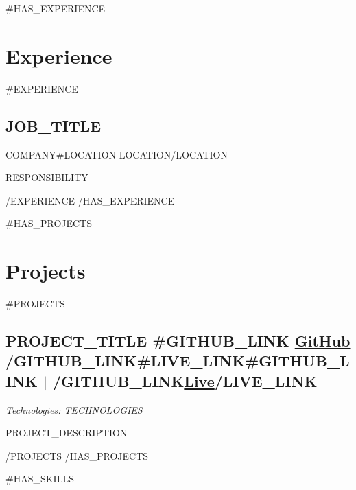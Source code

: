 \documentclass[10pt, a4paper]{article}
\newcommand{\subtext}[1]{
#1\par\vspace{-0.2cm}}
\begin{document}
{{#HAS_EXPERIENCE}}
\section{Experience}
{{#EXPERIENCE}}

\subsection*{{{JOB_TITLE}} \hfill {\normalsize {}}}
\subtext{{{COMPANY}}{{#LOCATION}} \hfill {{LOCATION}}{{/LOCATION}}}
    \begin{itemize}[itemsep=0pt, parsep=1pt, leftmargin=1em]
        {{RESPONSIBILITY}}
    \end{itemize}
    \vspace{-0.3cm}
{{/EXPERIENCE}}
{{/HAS_EXPERIENCE}}

{{#HAS_PROJECTS}}
\section{Projects}
{{#PROJECTS}}
\subsection*{{{PROJECT_TITLE}} \hfill {{#GITHUB_LINK}} \href{{{GITHUB_LINK}}}{GitHub} {{/GITHUB_LINK}}{{#LIVE_LINK}}{{#GITHUB_LINK}} $|$ {{/GITHUB_LINK}}\href{{{LIVE_LINK}}}{Live}{{/LIVE_LINK}}}
\subtext{\small\textit{Technologies: {{{TECHNOLOGIES}}}}}
    \begin{itemize}[itemsep=0pt, parsep=1pt, leftmargin=1em]
        {{PROJECT_DESCRIPTION}}
    \end{itemize}
    \vspace{-0.25cm}
{{/PROJECTS}}
{{/HAS_PROJECTS}}

{{#HAS_SKILLS}}
\end{document}
